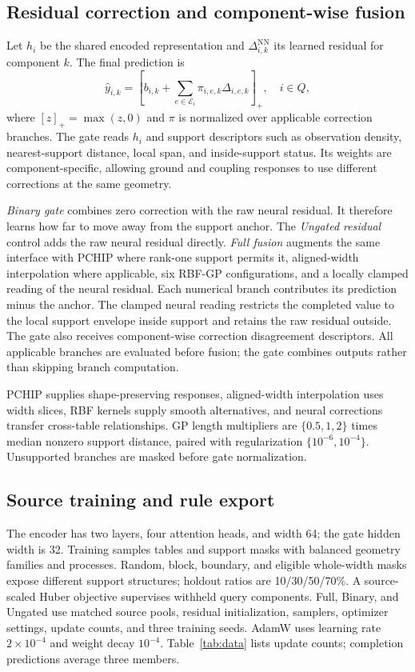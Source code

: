 \documentclass[conference,9pt,letterpaper]{IEEEtran}
\begin{document}
\subsection{Residual correction and component-wise fusion}
Let $h_i$ be the shared encoded representation and $\Delta^{\mathrm{NN}}_{i,k}$ its learned residual for component $k$. The final prediction is
\begin{equation}
\widehat y_{i,k}=\left[b_{i,k}+\sum_{e\in\mathcal E_i}\pi_{i,e,k}\Delta_{i,e,k}\right]_+,\quad i\in Q,
\label{eq:prediction}
\end{equation}
where $[z]_+=\max(z,0)$ and $\pi$ is normalized over applicable correction branches. The gate reads $h_i$ and support descriptors such as observation density, nearest-support distance, local span, and inside-support status. Its weights are component-specific, allowing ground and coupling responses to use different corrections at the same geometry.

\emph{Binary gate} combines zero correction with the raw neural residual. It therefore learns how far to move away from the support anchor. The \emph{Ungated residual} control adds the raw neural residual directly. \emph{Full fusion} augments the same interface with PCHIP where rank-one support permits it, aligned-width interpolation where applicable, six RBF-GP configurations, and a locally clamped reading of the neural residual. Each numerical branch contributes its prediction minus the anchor. The clamped neural reading restricts the completed value to the local support envelope inside support and retains the raw residual outside. The gate also receives component-wise correction disagreement descriptors. All applicable branches are evaluated before fusion; the gate combines outputs rather than skipping branch computation.

PCHIP supplies shape-preserving responses, aligned-width interpolation uses width slices, RBF kernels supply smooth alternatives, and neural corrections transfer cross-table relationships. GP length multipliers are $\{0.5,1,2\}$ times median nonzero support distance, paired with regularization $\{10^{-6},10^{-4}\}$. Unsupported branches are masked before gate normalization.

\subsection{Source training and rule export}
The encoder has two layers, four attention heads, and width 64; the gate hidden width is 32. Training samples tables and support masks with balanced geometry families and processes. Random, block, boundary, and eligible whole-width masks expose different support structures; holdout ratios are 10/30/50/70\%. A source-scaled Huber objective supervises withheld query components. Full, Binary, and Ungated use matched source pools, residual initialization, samplers, optimizer settings, update counts, and three training seeds. AdamW uses learning rate $2\!\times\!10^{-4}$ and weight decay $10^{-4}$. Table~\ref{tab:data} lists update counts; completion predictions average three members.
\end{document}
